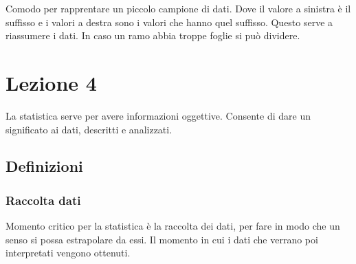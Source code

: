 \documentclass{article}
\begin{document}
\begin{minipage}[c]{0.30\textwidth}
    \centering
    \vspace{-2mm}
\end{minipage}
\hspace{2mm}
\begin{minipage}[c]{0.6\textwidth}
  Comodo per rapprentare un piccolo campione di dati. Dove il valore a sinistra è il suffisso e i valori a destra sono i valori che hanno quel suffisso. Questo serve a riassumere i dati. In caso un ramo abbia troppe foglie si può dividere.
    \vspace{-3mm}
\end{minipage}
\vspace{1mm}

\section*{Lezione 4}

La statistica serve per avere informazioni oggettive. Consente di dare un significato ai dati, descritti e analizzati.

\subsection*{Definizioni}

\subsubsection*{Raccolta dati}
Momento critico per la statistica è la raccolta dei dati, per fare in modo che un senso si possa estrapolare da essi. Il momento in cui i dati che verrano poi interpretati vengono ottenuti.
\end{document}
